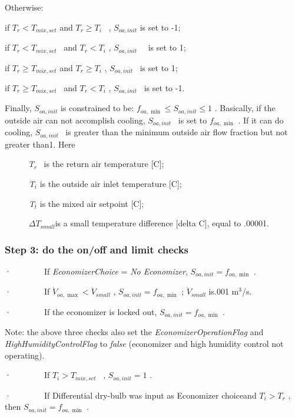 Otherwise:

if \({T_r} < {T_{mix,set}}\) and \({T_r} \ge {T_i}\) ~, \({S_{oa,init}}\) is set to -1;

if \({T_r} < {T_{mix,set}}\) ~and \({T_r} < {T_i}\) , \({S_{oa,init}}\) ~~is set to 1;

if \({T_r} \ge {T_{mix,set}}\) and \({T_r} \ge {T_i}\) , \({S_{oa,init}}\) ~is set to 1;

if \({T_r} \ge {T_{mix,set}}\) ~and \({T_r} < {T_i}\) , \({S_{oa,init}}\) ~is set to -1.

Finally, \({S_{oa,init}}\) is constrained to be: \({f_{oa,\min }} \le {S_{oa,init}} \le 1\) . Basically, if the outside air can not accomplish cooling, \({S_{oa,init}}\) ~is set to \({f_{oa,\min }}\) . If it can do cooling, \({S_{oa,init}}\) ~is greater than the minimum outside air flow fraction but not greater than1. Here

~~~~~ \emph{T\(_{r}\)} ~is the return air temperature {[}C{]};

\emph{~~~~~ T\(_{i}\)} is the outside air inlet temperature {[}C{]};

\emph{~~~~~ T\(_{t}\)} is the mixed air setpoint {[}C{]};

\emph{~~~~~ \(\Delta {T_{small}}\)}is a small temperature difference {[}delta C{]}, equal to .00001.

\subsubsection{Step 3: do the on/off and limit checks}\label{step-3-do-the-onoff-and-limit-checks}

·~~~~~~~~If \emph{EconomizerChoice} = \emph{No Economizer}, \({S_{oa,init}} = {f_{oa,\min }}\) .

·~~~~~~~~If \({\dot V_{oa,\max }} < {\dot V_{small}}\) , \({S_{oa,init}} = {f_{oa,\min }}\) ; \({\dot V_{small}}\) is.001 m\(^{3}\)/s.

·~~~~~~~~If the economizer is locked out, \({S_{oa,init}} = {f_{oa,\min }}\) .

Note: the above three checks also set the \emph{EconomizerOperationFlag} and \emph{HighHumidityControlFlag} to \emph{false} (economizer and high humidity control not operating).

·~~~~~~~~If \({T_i} > {T_{mix,set}}\) ~, \({S_{oa,init}} = 1\) .

·~~~~~~~~If Differential dry-bulb was input as Economizer choiceand \({T_i} > {T_r}\) , then \({S_{oa,init}} = {f_{oa,\min }}\) .

